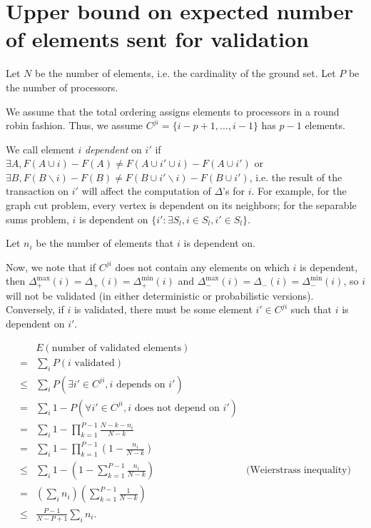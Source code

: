 \section{Upper bound on expected number of elements sent for validation}
\label{app:proofocc}
Let $N$ be the number of elements, i.e. the cardinality of the ground set.
Let $P$ be the number of processors.

We assume that the total ordering assigns elements to processors in a round robin fashion.
Thus, we assume $C^{ji}=\{i-p+1,\dots,i-1\}$ has $p-1$ elements.

We call element $i$ \textit{dependent} on $i'$ if $\exists A, F(A\cup i)-F(A) \neq F(A\cup i' \cup i)-F(A\cup i')$ or $\exists B, F(B\backslash i)-F(B) \neq F(B\cup i'\backslash i) - F(B\cup i')$, i.e. the result of the transaction on $i'$ will affect the computation of $\Delta$'s for $i$.
For example, for the graph cut problem, every vertex is dependent on its neighbors; for the separable sums problem, $i$ is dependent on $\{i': \exists S_l, i\in S_l, i'\in S_l\}$.

Let $n_i$ be the number of elements that $i$ is dependent on.

Now, we note that if $C^{ji}$ does not contain any elements on which $i$ is dependent, then $\Delta_{+}^\text{max}(i) = \Delta_{+}(i) = \Delta_{+}^\text{min}(i)$ and $\Delta_{-}^\text{max}(i) = \Delta_{-}(i) = \Delta_{-}^\text{min}(i)$, so $i$ will not be validated (in either deterministic or probabilistic versions).
Conversely, if $i$ is validated, there must be some element $i'\in C^{ji}$ such that $i$ is dependent on $i'$.

\begin{align*}
&E(\text{number of validated elements})\\
=& \sum_i P(i \text{ validated})\\
\leq& \sum_i P(\exists i'\in C^{ji}, i \text{ depends on } i')\\
=& \sum_i 1-P(\forall i'\in C^{ji}, i \text{ does not depend on } i')\\
=& \sum_i 1-\prod_{k=1}^{P-1}\frac{N-k-n_i}{N-k}\\
=& \sum_i 1-\prod_{k=1}^{P-1}\left(1-\frac{n_i}{N-k}\right)\\
\leq& \sum_i 1-\left(1-\sum_{k=1}^{P-1}\frac{n_i}{N-k}\right) & \text{(Weierstrass inequality)}\\
=& \left(\sum_i n_i\right)\left(\sum_{k=1}^{P-1}\frac{1}{N-k}\right)\\
\leq& \frac{P-1}{N-P+1}\sum_i n_i.
\end{align*}


